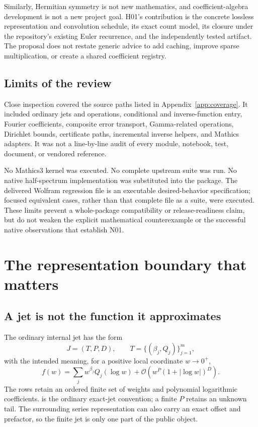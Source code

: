 \documentclass[11pt,letterpaper]{article}
\newcommand{\code}[1]{\texttt{\small\detokenize{#1}}}
\newcommand{\OO}{\mathcal O}
\begin{document}
Similarly, Hermitian symmetry is not new mathematics, and coefficient-algebra development is not a new project goal. H01's contribution is the concrete lossless representation and convolution schedule, its exact count model, its closure under the repository's existing Euler recurrence, and the independently tested artifact. The proposal does not restate generic advice to add caching, improve sparse multiplication, or create a shared coefficient registry.

\subsection{Limits of the review}
Close inspection covered the source paths listed in Appendix~\ref{app:coverage}. It included ordinary jets and operations, conditional and inverse-function entry, Fourier coefficients, composite error transport, Gamma-related operations, Dirichlet bounds, certificate paths, incremental inverse helpers, and Mathics adapters. It was not a line-by-line audit of every module, notebook, test, document, or vendored reference.

No Mathics3 kernel was executed. No complete upstream suite was run. No native half-spectrum implementation was substituted into the package. The delivered Wolfram regression file is an executable desired-behavior specification; focused equivalent cases, rather than that complete file as a suite, were executed. These limits prevent a whole-package compatibility or release-readiness claim, but do not weaken the explicit mathematical counterexample or the successful native observations that establish N01.

\section{The representation boundary that matters}
\subsection{A jet is not the function it approximates}
The ordinary internal jet has the form
\begin{equation}\label{eq:jet}
 J=(T,P,D),\qquad
 T=\{(\beta_j,Q_j)\}_{j=1}^{m},
\end{equation}
with the intended meaning, for a positive local coordinate \(w\to0^+\),
\begin{equation}\label{eq:meaning}
 f(w)=\sum_j w^{\beta_j}Q_j(\log w)
       +\OO\!\left(w^P(1+|\log w|)^D\right).
\end{equation}
The rows retain an ordered finite set of weights and polynomial logarithmic coefficients. \code{P === Infinity} is the ordinary exact-jet convention; a finite \(P\) retains an unknown tail. The surrounding series representation can also carry an exact offset and prefactor, so the finite jet is only one part of the public object.\cite{core,operations}
\end{document}
